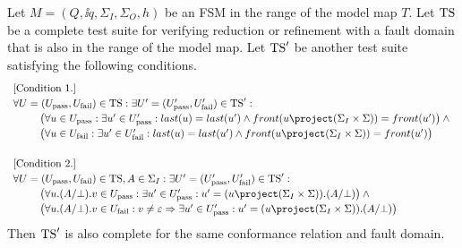 \begin{theorem}\label{th:fsmT}
Let $M = (Q,\ii q, \Sigma_I,\Sigma_O,h)$ be an FSM in the range of the model map $T$. 
Let ${\text{TS}}$ be  a complete test suite for verifying reduction or refinement with a fault domain that is also in the range of the model map. Let ${\text{TS}}'$ be another test suite satisfying the following conditions.
\[
\def\arraystretch{1.2}
\begin{array}{l}
\text{[Condition~1.]}
\\
  \forall U = (\xpass U,\xfail U)\in\TS: \exists  U' = (\xpass U',\xfail U')\in\TS':
\\\tabc
\big( \forall u\in \xpass U: \exists u'\in \xpass U': 
 last(u) = last(u') \wedge front(u\project(\Sigma_I\times\Sigma)) = front(u')\big)
 \wedge {} 
 \\\tabc
 \big( \forall u\in \xfail U: \exists u'\in \xfail U': 
 last(u) = last(u') \wedge front(u\project(\Sigma_I\times\Sigma)) = front(u')\big)
 \\ {~}
 \\
 \text{[Condition~2.]}
\\
  \forall U = (\xpass U,\xfail U)\in\TS, A\in\Sigma_I: 
  \exists  U' = (\xpass U',\xfail U')\in\TS':
\\\tabc
\big( \forall u.(A/\bot).v\in \xpass U: \exists u'\in \xpass U': 
 u' = (u\project(\Sigma_I\times\Sigma)).(A/\bot)
 \big)
 \wedge {} 
 \\\tabc
\big( \forall u.(A/\bot).v\in \xfail U: v \neq\varepsilon\Rightarrow\exists u'\in \xpass U': 
 u' = (u\project(\Sigma_I\times\Sigma)).(A/\bot)
 \big)
\end{array}
\def\arraystretch{1}
\]
Then ${\text{TS}}'$ is also complete for the same conformance relation and fault domain.
\end{theorem}
